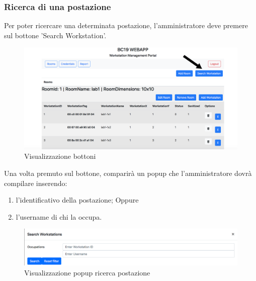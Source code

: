 \subsubsection{Ricerca di una postazione}
Per poter ricercare una determinata postazione, l'amministratore deve premere sul bottone 'Search Workstation'.
\begin{figure}[H]
	\centering
	\includegraphics[width=15cm]{res/images/bottoneSearchWorkstation.png}
	\caption{Visualizzazione bottoni}
\end{figure}
Una volta premuto sul bottone, comparirà un popup che l'amministratore dovrà compilare inserendo:
\begin{enumerate}
\item l'identificativo della postazione;
Oppure
\item l'username di chi la occupa.
\end{enumerate}
\begin{figure}[H]
	\centering
	\includegraphics[width=15cm]{res/images/ricercaPostazione.png}
	\caption{Visualizzazione popup ricerca postazione}
\end{figure}

